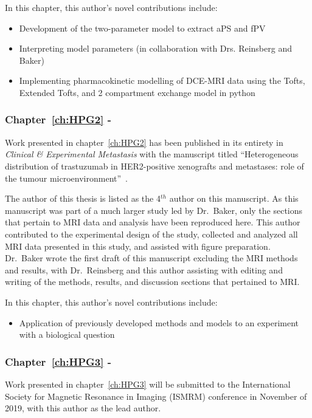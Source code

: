 In this chapter, this author's novel contributions include:

\begin{itemize}
\item Development of the two-parameter model to extract \acs{aPS} and \acs{fPV}
\item Interpreting model parameters (in collaboration with Drs. Reinsberg and Baker)
\item Implementing pharmacokinetic modelling of DCE-MRI data using the Tofts, Extended Tofts, and 2 compartment exchange model in python
\end{itemize}

\subsubsection{Chapter~\ref{ch:HPG2} - }

Work presented in chapter~\ref{ch:HPG2} has been published in its entirety in \emph{Clinical \& Experimental Metastasis} with the manuscript titled ``Heterogeneous distribution of trastuzumab in HER2-positive xenografts and metastases: role of the tumour microenvironment''~\cite{Baker:2018ex}.

The author of this thesis is listed as the 4$^{th}$ author on this manuscript.
As this manuscript was part of a much larger study led by Dr.\ Baker, only the sections that pertain to MRI data and analysis have been reproduced here.
This author contributed to the experimental design of the study, collected and analyzed all MRI data presented in this study, and assisted with figure preparation.
Dr.\ Baker wrote the first draft of this manuscript excluding the MRI methods and results, with Dr.\ Reinsberg and this author assisting with editing and writing of the methods, results, and discussion sections that pertained to MRI.

In this chapter, this author's novel contributions include:

\begin{itemize}
\item Application of previously developed methods and models to an experiment with a biological question
\end{itemize}

\subsubsection{Chapter~\ref{ch:HPG3} - }

Work presented in chapter~\ref{ch:HPG3} will be submitted to the International Society for Magnetic Resonance in Imaging (ISMRM) conference in November of 2019, with this author as the lead author.

